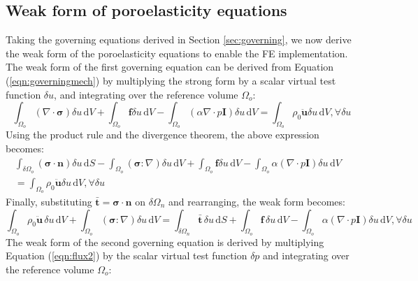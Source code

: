 \documentclass[oneside,11pt,times]{book}
\begin{document}
\subsection{Weak form of poroelasticity equations}
 \label{subsectionWeakFormPorous}
Taking the governing equations derived in Section \ref{sec:governing}, we now derive the weak form of the poroelasticity equations to enable the FE implementation. The weak form of the first governing equation can be derived from Equation (\ref{eqn:governingmech}) by multiplying the strong form by a scalar virtual test function $\delta u$, and integrating over the reference volume $\Omega_{o}$:
\begin{equation} 
 \int_{\Omega_{o}} \left( \nabla  \cdot \bm{\sigma} \right)  \delta u \, \text{d} V + \int_{\Omega_{o}}  \bm{f}  \delta u  \, \text{d} V - \int_{\Omega_{o}} \left( \alpha \nabla \cdot p \bm{I} \right)  \delta u \, \text{d} V = \int_{\Omega_{o}} \rho_0 \ddot{\bm{u}}  \delta u  \, \text{d} V , \forall \delta u
\end{equation}
\noindent Using the product rule and the divergence theorem, the above expression becomes:
\begin{equation}
\begin{split} 
 \int_{\delta\Omega_{o}} \left(  \bm{\sigma}  \cdot \bm{n} \right)  \delta u \, \text{d} S - \int_{\Omega_{o}} \left(  \bm{\sigma}  : \nabla \right)  \delta u \, \text{d} V  + \int_{\Omega_{o}}  \bm{f}  \delta u  \, \text{d} V - \int_{\Omega_{o}} \alpha \left(  \nabla \cdot p \bm{I} \right)  \delta u \, \text{d} V&\\ = \int_{\Omega_{o}} \rho_0 \ddot{\bm{u}}  \delta u  \, \text{d} V , \forall \delta u&
\end{split}
\end{equation}
\noindent Finally, substituting $\bar{\bm{t}} = \bm{\sigma}  \cdot \bm{n}$ on $\delta \Omega_n$ and rearranging, the weak form becomes: 
\begin{equation} \label{eqn:weakmech}
 \int_{\Omega_{o}} \rho_0 \ddot{\bm{u}}\,  \delta u  \, \text{d} V + \int_{\Omega_{o}} \left(  \bm{\sigma}  : \nabla \right)  \delta u \, \text{d} V =  \int_{\delta\Omega_{n}} \bar{\bm{t}}\,  \delta u \, \text{d} S  + \int_{\Omega_{o}}  \bm{f}\,  \delta u  \, \text{d} V - \int_{\Omega_{o}} \alpha \left(  \nabla \cdot p \bm{I} \right)  \delta u \, \text{d} V , \forall \delta u
\end{equation}
The weak form of the second governing equation is derived by multiplying Equation (\ref{eqn:flux2}) by the scalar virtual test function $\delta p$ and integrating over the reference volume $\Omega_{o}$: %
\end{document}
